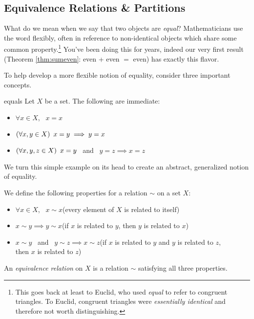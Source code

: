 \begin{exercises}{}{}
\end{exercises}

\clearpage


\subsection{Equivalence Relations \& Partitions}\label{sec:equiv}


What do we mean when we say that two objects are \emph{equal}? Mathematicians use the word flexibly, often in reference to non-identical objects which share some common property.\footnote{This goes back at least to Euclid, who used \emph{equal} to refer to congruent triangles. To Euclid, congruent triangles were \emph{essentially identical} and therefore not worth distinguishing.} You've been doing this for years, indeed our very first result (Theorem \ref{thm:sumeven}: even + even $=$ even) has exactly this flavor.\smallbreak

To help develop a more flexible notion of equality, consider three important concepts.

\begin{example}{}{equals}
	Let $X$ be a set. The following are immediate:
	\begin{itemize}\itemsep1pt
	  \item[] $\forall x\in X$, \ $x=x$
		\item[]\eqsymm $(\forall x,y\in X)\lstsp x=y\implies y=x$
		\item[]\eqtrans $(\forall x,y,z\in X)\lstsp x=y$ \ and \ $y=z\implies x=z$
	\end{itemize}
\end{example}

We turn this simple example on its head to create an abstract, generalized notion of equality.

\begin{defn}{}{}
	We define the following properties for a relation\footnotemark{} $\sim$ on a set $X$:
	\begin{itemize}\itemsep1pt
	  \item[] $\forall x\in X$, \ $x\sim x$\hfill(every element of $X$ is related to itself)
		\item[]\eqsymm $x\sim y\implies y\sim x$\hfill(if $x$ is related to $y$, then $y$ is related to $x$)
		\item[]\eqtrans $x\sim y$ \ and \ $y\sim z\implies x\sim z$\hfill(if $x$ is related to $y$ and $y$ is related to $z$,\\
		\phantom{bob}\hfill then $x$ is related to $z$)
	\end{itemize}
	An \emph{equivalence relation} on $X$ is a relation $\sim$ satisfying all three properties.
\end{defn}

